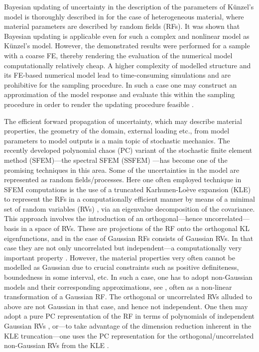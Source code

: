 \documentclass[preprint,12pt]{elsarticle}
\begin{document}
Bayesian updating of uncertainty in the description of the parameters
of K\"unzel's model is thoroughly described in
\cite{Kucerova:2011:AMC} for the case of heterogeneous material, where
material parameters are described by random fields (RFs). It was shown
that Bayesian updating is applicable even for such a complex and
nonlinear model as K\"unzel's model.  However, the demonstrated
results were performed for a sample with a coarse FE, thereby
rendering the evaluation of the numerical model computationally
relatively cheap. A higher complexity of modelled structure and its
FE-based numerical model lead to time-consuming simulations and are
prohibitive for the sampling procedure. In such a case one may
construct an approximation of the model response and evaluate this
within the sampling procedure in order to render the updating
procedure feasible \cite{Marzouk:2007:JCP, Marzouk:2009:JCP}.

The efficient forward propagation of uncertainty, which may describe
material properties, the geometry of the domain, external loading
etc., from model parameters to model outputs is a main topic of stochastic
mechanics. The recently developed polynomial chaos (PC) variant
of the stochastic finite element method (SFEM)---the spectral SFEM (SSFEM)
\cite{Ghanem:2003, Babuska:2004:SIAM, Matthies:2005:CMAME,
  Matthies:1997:SS, Keese:2004:PHD}---has become one of the promising
techniques in this area. Some of the uncertainties in the model are
represented as random fields/processes.
Here one often employed technique in SFEM computations
is the use of a truncated Karhunen-Lo\`eve
expansion (KLE) to represent the RFs in a computationally
efficient manner by means of a minimal set of random variables (RVs)
\cite{Ghanem:1989, Matthies:2005:CMAME, Matthies:2007:IB,
  Chen:2008:CMAME}, via an eigenvalue decomposition of the covariance.
This approach involves the
introduction of an orthogonal---hence uncorrelated---basis in a space
of RVs.  These are projections of
the RF onto the orthogonal KL eigenfunctions, and in
the case of Gaussian RFs consists of Gaussian RVs.  In that case they
are not only uncorrelated but independent---a computationally very
important property \cite{Keese:2003:TR}.
However, the
material properties very often cannot be modelled as Gaussian due
to crucial constraints such as positive definiteness, boundedness in
some interval, etc. In such a case, one has to adopt non-Gaussian
models and their corresponding approximations, see
\cite{Matthies:1997:SS, Keese:2004:PHD, Colliat:2007:CRM}, often as
a non-linear transformation of a Gaussian RF.  The orthogonal or
uncorrelated RVs alluded to above are not Gaussian in that case, and
hence not independent.  One then may adopt a pure PC representation of
the RF in terms of polynomials of independent Gaussian RVs
\cite{Ghanem:2003}, or---to take advantage of the dimension reduction
inherent in the KLE truncation---one uses the PC representation for
the orthogonal/uncorrelated non-Gaussian RVs from the KLE
\cite{Matthies:2005:CMAME, Matthies:2007:IB}.
\end{document}
